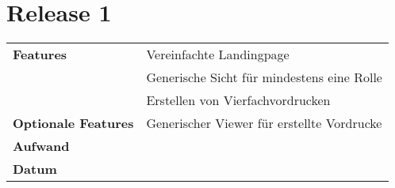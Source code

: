 \section*{Release 1 }
\label{sec:release_1}

\begin{tabular}{p{5cm} p{9cm}}
    \textbf{Features} & Vereinfachte Landingpage \\
    & Generische Sicht für mindestens eine Rolle \\
    & Erstellen von Vierfachvordrucken \\
    \textbf{Optionale Features} & Generischer Viewer für erstellte Vordrucke \\
    \hline
    \textbf{Aufwand} &  \\
    \hline
    \textbf{Datum} & 
\end{tabular}
